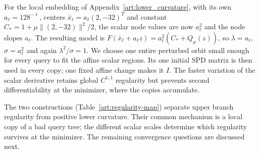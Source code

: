 For the local embedding of Appendix~\ref{art:lower_curvature}, with its own
$a_\ell=128^{-\ell}$, centers $\bar x_\ell=a_\ell(2,-32)^T$ and constant
$C_*=1+\mu\|(2,-32)\|^2/2$, the scalar node values are now $a_\ell^2$ and the
node slopes $a_\ell$. The resulting model is
$F(\bar x_\ell+a_\ell z)=a_\ell^2(C_*+Q_\mu(z))$, so
$\lambda=a_\ell$, $\sigma=a_\ell^2$ and again
$\lambda^2/\sigma=1$. We choose one entire perturbed orbit small enough
for every query to fit the affine scalar regions. Its one initial SPD
matrix is then used in every copy; one fixed affine change makes it $I$.
The faster variation of the scalar derivative retains global $C^{1,1}$
regularity but prevents second differentiability at the minimizer, where the
copies accumulate.

The two constructions (Table~\ref{art:regularity-map}) separate upper branch
regularity from positive lower
curvature. Their common mechanism is a local copy of a bad query
tree; the different scalar scales determine which regularity survives at
the minimizer. The remaining convergence questions are discussed
next.
